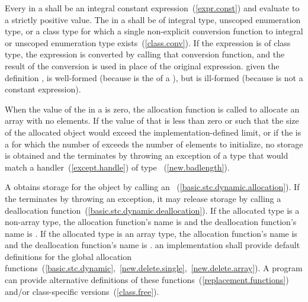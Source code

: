 \pnum
Every  in a
 shall be an integral constant
expression~(\ref{expr.const}) and evaluate to a strictly positive value.
%
The  in a  shall be
of integral type, unscoped enumeration type, or a class type for which a single
non-explicit conversion function to integral or unscoped enumeration type
exists~(\ref{class.conv}). If the expression is of class type, the
expression is converted by calling that conversion function, and the
result of the conversion is used in place of the original expression.
\enterexample
given the definition ,
 is well-formed (because  is the
 of a ), but
 is ill-formed (because  is not a
constant expression).
\exitexample 

\pnum
{}%
When the value of the  in a 
is zero, the allocation function is called to allocate an array with no elements. If the
value of that  is less than zero or such that the size of the allocated object
would exceed the implementation-defined limit,
or if the  is a  for
which the number of  exceeds the number of
elements to initialize,
no storage is obtained and the
 terminates by throwing an exception of a type that would
match a handler~(\ref{except.handle}) of type
~(\ref{new.badlength}).

\pnum
A  obtains storage for the object by calling an
~(\ref{basic.stc.dynamic.allocation}). If
the  terminates by throwing an exception, it
may release storage by calling a deallocation
function~(\ref{basic.stc.dynamic.deallocation}). If the allocated type
is a non-array type, the allocation function's name is
%
%
 and the deallocation function's name is
. If the allocated type is an array type, the
allocation function's name is
%
%
and the deallocation function's name is
.
\enternote 
an implementation shall provide default definitions for the global
allocation
functions~(\ref{basic.stc.dynamic},~\ref{new.delete.single},~\ref{new.delete.array}).
A \Cpp program can provide alternative definitions of
these functions~(\ref{replacement.functions}) and/or class-specific
versions~(\ref{class.free}).
\exitnote 

